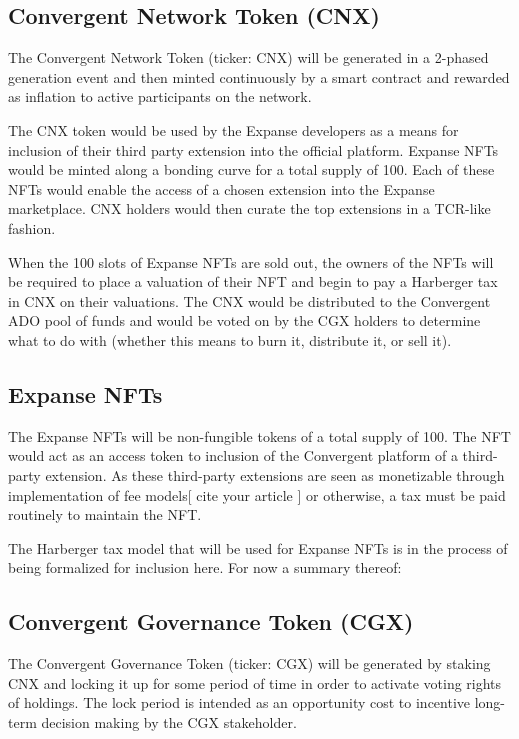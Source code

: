 \documentclass[a4paper]{article}
\begin{document}
\subsection{Convergent Network Token (CNX)}

The Convergent Network Token (ticker: CNX) will be generated in a 2-phased generation event and then minted continuously by a smart contract and rewarded as inflation to active participants on the network. 

The CNX token would be used by the Expanse developers as a means for inclusion of their third party extension into the official platform. Expanse NFTs would be minted along a bonding curve for a total supply of 100. Each of these NFTs would enable the access of a chosen extension into the Expanse marketplace. CNX holders would then curate the top extensions in a TCR-like fashion. 

When the 100 slots of Expanse NFTs are sold out, the owners of the NFTs will be required to place a valuation of their NFT and begin to pay a Harberger tax in CNX on their valuations. The CNX would be distributed to the Convergent ADO pool of funds and would be voted on by the CGX holders to determine what to do with (whether this means to burn it, distribute it, or sell it). 

\subsection{Expanse NFTs}

The Expanse NFTs will be non-fungible tokens of a total supply of 100. The NFT would act as an access token to inclusion of the Convergent platform of a third-party extension. As these third-party extensions are seen as monetizable through implementation of fee models[ cite your article ] or otherwise, a tax must be paid routinely to maintain the NFT.

The Harberger tax model that will be used for Expanse NFTs is in the process of being formalized for inclusion here. For now a summary thereof: 

\subsection{Convergent Governance Token (CGX)}

The Convergent Governance Token (ticker: CGX) will be generated by staking CNX and locking it up for some period of time in order to activate voting rights of holdings. The lock period is intended as an opportunity cost to incentive long-term decision making by the CGX stakeholder. 
\end{document}
